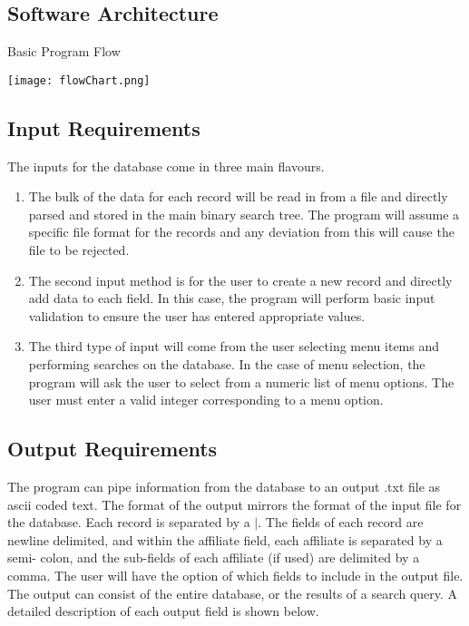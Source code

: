 \documentclass[11pt]{article}
\begin{document}
\subsection*{Software Architecture}
\vspace{1cm}
Basic Program Flow	
	
\texttt{[image: flowChart.png]}


\subsection*{Input Requirements}

	The inputs for the database come in three main flavours. 

	\begin{enumerate}
		\item The bulk of the data for each record will be read in from a file and directly parsed and stored in the main
		      binary search tree. The program will assume a specific file format for the records and any deviation from
		      this will cause the file to be rejected.
		
		\item The second input method is for the user to create a new record and directly add data to each field. In this
		   	  case, the program will perform basic input validation to ensure the user has entered appropriate values. 

		\item The third type of input will come from the user selecting menu items and performing searches on the database.
		  	  In the case of menu selection, the program will ask the user to select from a numeric list of menu options. 
		  	  The user must enter a valid integer corresponding to a menu option.	
		
	\end{enumerate}		
	

\subsection*{Output Requirements}

	The program can pipe information from the database to an output .txt file as ascii 
coded text. The format of the output mirrors the format of the input file for the database. Each record is separated by a $
|$. The fields of each record are newline delimited, and within the affiliate field, each affiliate is separated by a semi-
colon, and the sub-fields of each affiliate (if used) are delimited by a comma. The user will have the option of which 
fields to include in the output file. The output can consist of the entire database, or the results of a search query. A 
detailed description of each output field is shown below.
\end{document}
